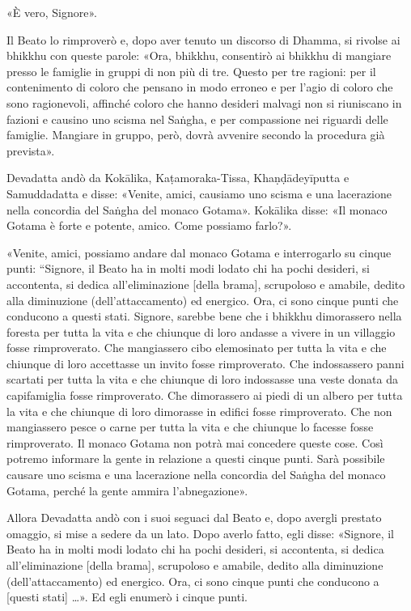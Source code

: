 «È vero, Signore».


Il Beato lo rimproverò e, dopo aver tenuto un discorso di Dhamma, si
rivolse ai bhikkhu con queste parole: «Ora, bhikkhu, consentirò ai
bhikkhu di mangiare presso le famiglie in gruppi di non più di tre.
Questo per tre ragioni: per il contenimento di coloro che pensano in
modo erroneo e per l’agio di coloro che sono ragionevoli, affinché
coloro che hanno desideri malvagi non si riuniscano in fazioni e causino
uno scisma nel Saṅgha, e per compassione nei riguardi delle famiglie.
Mangiare in gruppo, però, dovrà avvenire secondo la procedura già
prevista».




Devadatta andò da Kokālika, Kaṭamoraka-Tissa, Khaṇḍādeyīputta e
Samuddadatta e disse: «Venite, amici, causiamo uno scisma e una
lacerazione nella concordia del Saṅgha del monaco Gotama». Kokālika
disse: «Il monaco Gotama è forte e potente, amico. Come possiamo
farlo?».


«Venite, amici, possiamo andare dal monaco Gotama e interrogarlo su
cinque punti: “Signore, il Beato ha in molti modi lodato chi ha pochi
desideri, si accontenta, si dedica all’eliminazione [della brama],
scrupoloso e amabile, dedito alla diminuzione (dell’attaccamento) ed
energico. Ora, ci sono cinque punti che conducono a questi stati.
Signore, sarebbe bene che i bhikkhu dimorassero nella foresta per tutta
la vita e che chiunque di loro andasse a vivere in un villaggio fosse
rimproverato. Che mangiassero cibo elemosinato per tutta la vita e che
chiunque di loro accettasse un invito fosse rimproverato. Che
indossassero panni scartati per tutta la vita e che chiunque di loro
indossasse una veste donata da capifamiglia fosse rimproverato. Che
dimorassero ai piedi di un albero per tutta la vita e che chiunque di
loro dimorasse in edifici fosse rimproverato. Che non mangiassero pesce
o carne per tutta la vita e che chiunque lo facesse fosse rimproverato.
Il monaco Gotama non potrà mai concedere queste cose. Così potremo
informare la gente in relazione a questi cinque punti. Sarà possibile
causare uno scisma e una lacerazione nella concordia del Saṅgha del
monaco Gotama, perché la gente ammira l’abnegazione».


Allora Devadatta andò con i suoi seguaci dal Beato e, dopo avergli
prestato omaggio, si mise a sedere da un lato. Dopo averlo fatto, egli
disse: «Signore, il Beato ha in molti modi lodato chi ha pochi desideri,
si accontenta, si dedica all’eliminazione [della brama], scrupoloso e
amabile, dedito alla diminuzione (dell’attaccamento) ed energico. Ora,
ci sono cinque punti che conducono a [questi stati] …». Ed egli
enumerò i cinque punti.


